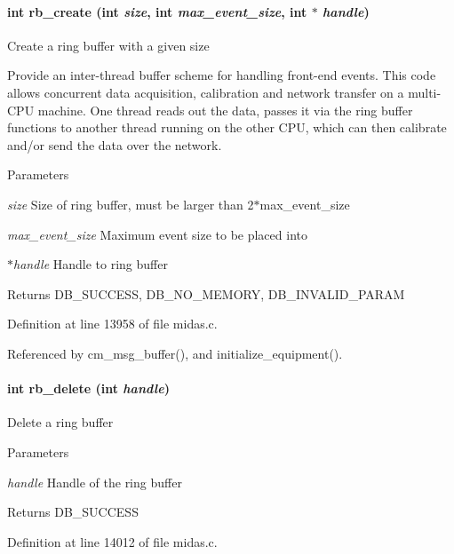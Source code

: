 \paragraph[{rb\_\-create}]{\setlength{\rightskip}{0pt plus 5cm}int rb\_\-create (int {\em size}, \/  int {\em max\_\-event\_\-size}, \/  int $\ast$ {\em handle})}\hfill\label{group__rbfunctionc_gae447c0770b51e5e0e173905f8700ce0f}
Create a ring buffer with a given size

Provide an inter-\/thread buffer scheme for handling front-\/end events. This code allows concurrent data acquisition, calibration and network transfer on a multi-\/CPU machine. One thread reads out the data, passes it via the ring buffer functions to another thread running on the other CPU, which can then calibrate and/or send the data over the network.


\begin{DoxyParams}{Parameters}
\item[{\em size}]Size of ring buffer, must be larger than 2$\ast$max\_\-event\_\-size \item[{\em max\_\-event\_\-size}]Maximum event size to be placed into \item[{\em $\ast$handle}]Handle to ring buffer \end{DoxyParams}
\begin{DoxyReturn}{Returns}
DB\_\-SUCCESS, DB\_\-NO\_\-MEMORY, DB\_\-INVALID\_\-PARAM 
\end{DoxyReturn}


Definition at line 13958 of file midas.c.

Referenced by cm\_\-msg\_\-buffer(), and initialize\_\-equipment().
\paragraph[{rb\_\-delete}]{\setlength{\rightskip}{0pt plus 5cm}int rb\_\-delete (int {\em handle})}\hfill\label{group__rbfunctionc_ga215007fcea0c4786c38091fd793f4c4e}
Delete a ring buffer 
\begin{DoxyParams}{Parameters}
\item[{\em handle}]Handle of the ring buffer \end{DoxyParams}
\begin{DoxyReturn}{Returns}
DB\_\-SUCCESS 
\end{DoxyReturn}


Definition at line 14012 of file midas.c.

